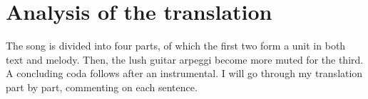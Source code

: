 \documentclass[12pt,paper=a4]{scrartcl}
\begin{document}
\begin{quote}



\end{quote}

\section{Analysis of the translation}

The song is divided into four parts, of which the first two form a unit in both
text and melody. Then, the lush guitar arpeggi become more muted for the third.
A concluding coda follows after an instrumental. I will go through my
translation part by part, commenting on each sentence.
\end{document}
